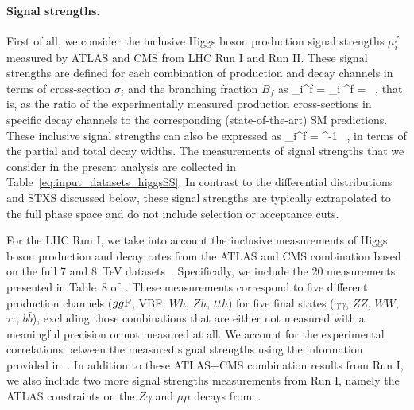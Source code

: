 \paragraph{Signal strengths.} 
First of all, we consider the inclusive Higgs boson production signal strengths
$\mu_i^f$ measured by ATLAS and CMS from LHC Run I and Run II.
These  signal strengths are defined for each combination
of production and decay channels in terms of cross-section $\sigma_i$
and the branching fraction $B_f$ as
\be
\mu_i^f \equiv {} = \mu_i \cdot \mu^f = \lp {} \rp
\lp  {}\rp \, ,
\ee
that is, as the ratio of the experimentally measured production cross-sections
in specific decay channels to the corresponding (state-of-the-art)
SM predictions.
%
These inclusive signal strengths can also be expressed as
\be
\label{eq:signal_strength_def}
\mu_i^f = \lp {} \rp
\lp  {}\rp
\lp  {}\rp^{-1} \, ,
\ee
in terms of the partial and total decay widths. The measurements of
signal strengths that we consider in the present analysis
are collected in Table~\ref{eq:input_datasets_higgsSS}.
In contrast to the differential distributions and STXS discussed below,
these signal strengths are typically extrapolated to the full phase space and
do not include selection or acceptance cuts.



For the LHC Run I, we take into account the inclusive
measurements of  Higgs boson production and decay rates from the ATLAS and CMS
combination based on the full 7 and 8~TeV datasets~\cite{Khachatryan:2016vau}.
Specifically, we include the 20 measurements presented in Table~8
of~\cite{Khachatryan:2016vau}. These measurements correspond to five different
production channels ($gg{\rm F}$, VBF, $Wh$, $Zh$, $tth$) for five final
states ($\gamma\gamma$, $ZZ$, $WW$, $\tau\tau$, $b\bar{b}$), 
excluding those combinations that are either not measured with
a meaningful precision or not measured at all.
We account for the experimental correlations between the measured
signal strengths using the information provided in~\cite{Khachatryan:2016vau}.
In addition to these ATLAS+CMS combination results from Run I, we also include
two more signal strengths measurements from Run I, namely the ATLAS
constraints on the $Z\gamma$ and $\mu\mu$ decays from~\cite{Aad:2015gba}.

